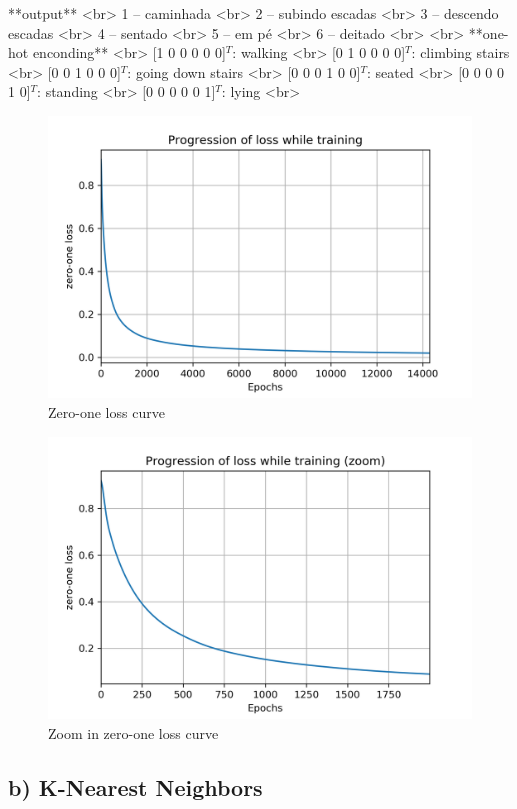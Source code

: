 \documentclass[a4paper]{article}
\begin{document}
**output** <br>
1 – caminhada <br>
2 – subindo escadas <br>
3 – descendo escadas <br>
4 – sentado <br>
5 – em pé <br>
6 – deitado <br>
<br>
**one-hot enconding** <br>
[1 0 0 0 0 0]$^T$: walking <br>
[0 1 0 0 0 0]$^T$: climbing stairs <br>
[0 0 1 0 0 0]$^T$: going down stairs <br>
[0 0 0 1 0 0]$^T$: seated <br>
[0 0 0 0 1 0]$^T$: standing <br>
[0 0 0 0 0 1]$^T$: lying <br>

\begin{figure}[H]
    \centering
    \includegraphics[width=12cm]{zero_one_loss}
    \caption{Zero-one loss curve}
    \label{fig:ex2-a-zero_one_loss}
\end{figure}

\begin{figure}[H]
    \centering
    \includegraphics[width=12cm]{zero_one_loss_zoom}
    \caption{Zoom in zero-one loss curve}
    \label{fig:ex2-a-zero_one_loss_zoom}
\end{figure}

\subsection{b) K-Nearest Neighbors}
\end{document}
